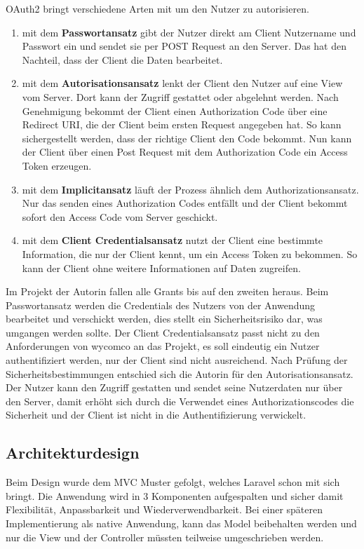OAuth2 bringt verschiedene Arten mit um den Nutzer zu autorisieren.

\begin{enumerate}
\item mit dem \textbf{Passwortansatz} gibt der Nutzer direkt am Client Nutzername und Passwort ein und sendet sie per POST Request an den Server. Das hat den Nachteil, dass der Client die Daten bearbeitet.
\item mit dem \textbf{Autorisationsansatz} lenkt der Client den Nutzer auf eine View vom Server. Dort kann der Zugriff gestattet oder abgelehnt werden. Nach Genehmigung bekommt der Client einen Authorization Code über eine Redirect URI, die der Client beim ersten Request angegeben hat. So kann sichergestellt werden, dass der richtige Client den Code bekommt. Nun kann der Client über einen Post Request mit dem Authorization Code ein Access Token erzeugen. 
\item mit dem \textbf{Implicitansatz} läuft der Prozess ähnlich dem Authorizationsansatz. Nur das senden eines Authorization Codes entfällt und der Client bekommt sofort den Access Code vom Server geschickt.
\item mit dem \textbf{Client Credentialsansatz} nutzt der Client eine bestimmte Information, die nur der Client kennt, um ein Access Token zu bekommen. So kann der Client ohne weitere Informationen auf Daten zugreifen.
\end{enumerate}

Im Projekt der Autorin fallen alle Grants bis auf den zweiten heraus. Beim Passwortansatz werden die Credentials des Nutzers von der Anwendung bearbeitet und verschickt werden, dies stellt ein Sicherheitsrisiko dar, was umgangen werden sollte.
Der Client Credentialsansatz passt nicht zu den Anforderungen von wycomco an das Projekt, es soll eindeutig ein Nutzer authentifiziert werden, nur der Client sind nicht ausreichend. Nach Prüfung der Sicherheitsbestimmungen entschied sich die Autorin für den Autorisationsansatz. Der Nutzer kann den Zugriff gestatten und sendet seine Nutzerdaten nur über den Server, damit erhöht sich durch die Verwendet eines Authorizationscodes die Sicherheit und der Client ist nicht in die Authentifizierung verwickelt.

\subsection{Architekturdesign}
\label{sec:Architekturdesign}

Beim Design wurde dem MVC Muster gefolgt, welches Laravel schon mit sich bringt. Die Anwendung wird in 3 Komponenten aufgespalten und sicher damit Flexibilität, Anpassbarkeit und Wiederverwendbarkeit.
Bei einer späteren Implementierung als native Anwendung, kann das Model beibehalten werden und nur die View und der Controller müssten teilweise umgeschrieben werden.

